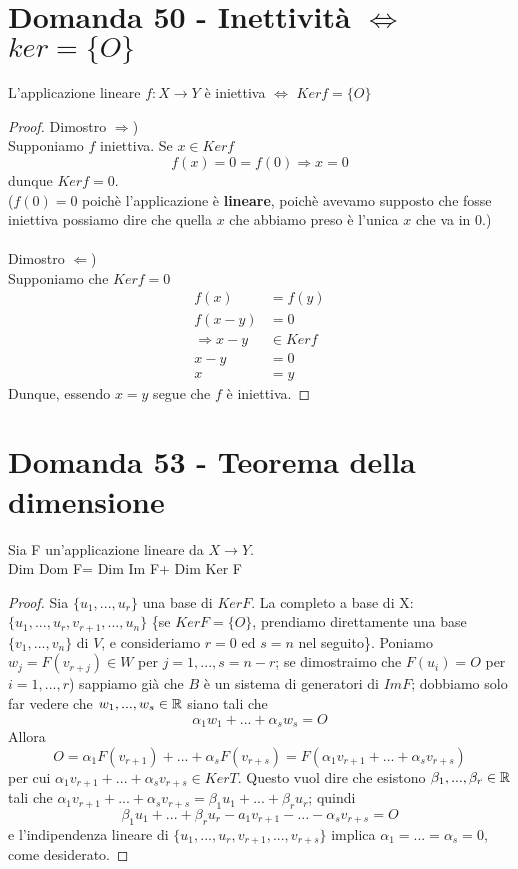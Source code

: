 \documentclass[]{article}
\begin{document}
\section{Domanda 50 - Inettività $\Leftrightarrow$ $ker = \{O\}$}
\begin{lem}
L'applicazione lineare $f: X \rightarrow Y$ è iniettiva $\Leftrightarrow$ $Kerf = \{O\}$
\end{lem}
\begin{proof} Dimostro $\Rightarrow$)\\
Supponiamo $f$ iniettiva. Se $x \in Ker f$ $$f(x) = 0 = f(0) \Rightarrow x = 0$$ dunque $Ker f = 0$.\\
($f(0) =  0$ poichè l'applicazione è \textbf{lineare}, poichè avevamo supposto che fosse iniettiva possiamo dire che quella $x$ che abbiamo preso è l'unica $x$ che va in $0$.)\\ \\
Dimostro $\Leftarrow$)\\
Supponiamo che $Ker f = 0$ 
\begin{align*}
f(x) &= f(y)\\
 f(x-y)&=0\\ \Rightarrow x-y &\in Kerf \\
x-y &= 0\\ x &= y
\end{align*}
Dunque, essendo $x=y$ segue che $f$ è iniettiva.
\end{proof}
\section{Domanda 53 - Teorema della dimensione}
\begin{lem}Sia F un'applicazione lineare da $X \rightarrow Y$. \\ Dim Dom F= Dim Im F+ Dim Ker F\end{lem}
\begin{proof}
Sia $\{u_1, ... , u_r\}$ una base di $KerF$. La completo a base di X: $\{u_1, ... , u_r, v_{r+1}, ..., u_n\}$ \{se $KerF = \{O\}$, prendiamo direttamente una base $\{v_1, ..., v_n\}$ di $V$, e consideriamo $r=0$ ed $s=n$ nel seguito\}. Poniamo $w_j = F(v_{r+j}) \in W$ per $j=1, ..., s = n-r$; se dimostraimo che $F(u_i)=O$ per $i=1,...,r$) sappiamo già che $B$ è un sistema di generatori di $ImF$; dobbiamo solo far vedere che $w_1, ..., w_s \in \mathbb{R}$ siano tali che $$\alpha_1 w_1 + ... + \alpha_s w_s = O$$
Allora
$$O = \alpha_1F(v_{r+1})+...+\alpha_sF(v_{r+s}) = F(\alpha_1v_{r+1}+...+\alpha_sv_{r+s})$$
per cui $\alpha_1v_{r+1}+...+\alpha_sv_{r+s} \in KerT$. Questo vuol dire che esistono $\beta_1, ..., \beta_r \in \mathbb{R}$ tali che $\alpha_1v_{r+1}+...+\alpha_sv_{r+s} = \beta_1u_1+...+\beta_ru_r$; quindi $$\beta_1u_1+...+\beta_ru_r-a_1v_{r+1}-...-\alpha_sv_{r+s}=O$$
e l'indipendenza lineare di $\{u_1, ..., u_r, v_{r+1},...,v_{r+s}\}$ implica $\alpha_1=...=\alpha_s=0$, come desiderato.
\end{proof}
\end{document}
